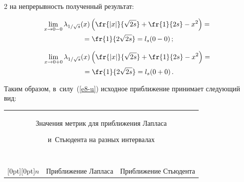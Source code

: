 \begin{multicols}{2}
на непрерывность полученный результат:



\noindent

\begin{multline*}

 \lim\limits_{x\rightarrow 0-0}\lambda_{1/\sqrt{s}}(x)\left( \fr{\left|x\right|}

 {\sqrt{2s}}+\fr{1}{2s}-x^2\right) ={}\\

 {}= \fr{1}{2\sqrt{2s}}

  = l_s(0-0)\,;

  \end{multline*}

  

  \vspace*{-12pt}

  

  \noindent

  \begin{multline*}

\lim\limits_{x\rightarrow 0+0}\lambda_{1/\sqrt{s}}(x)\left( 

\fr{\left|x\right|}{\sqrt{2s}}+\fr{1}{2s}-x^2\right) = {}\\

{}=\fr{1}{2\sqrt{2s}}

  = l_s(0+0)\,. 

  \end{multline*}

Таким образом, в~силу~(\ref{e8-u}) исходное приближение принимает следующий вид: 



\begin{table}[b]\small

\begin{center}



\begin{tabular}{|c|c|c|c|c|}

\multicolumn{5}{p{102mm}}{Значения метрик для приближения Лапласа 

и~Стьюдента на разных интервалах}  \\

\multicolumn{5}{c}{\ }\\[-6pt]

\hline

\multicolumn{1}{|c|}{\raisebox{-6pt}[0pt][0pt]{$n$}} & \multicolumn{2}{c|}{Приближение Лапласа} &  \multicolumn{2}{c|}{Приближение Стьюдента} \\


\end{tabular}
\end{center}
\end{table}
\end{multicols}
